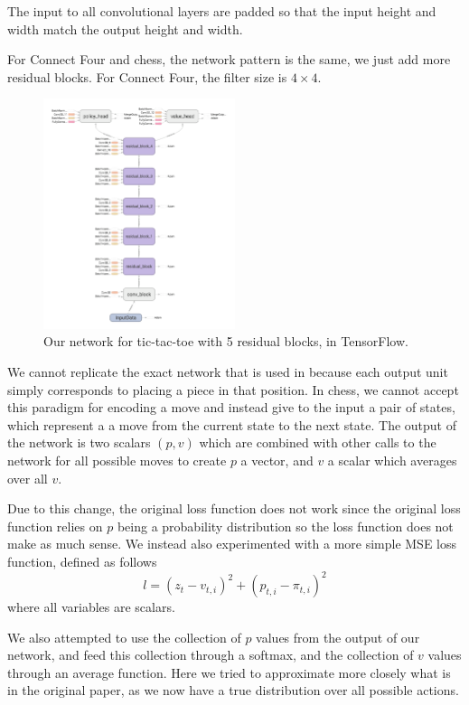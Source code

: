 \documentclass[english]{article}
\begin{document}
The input to all convolutional layers are padded so that the input height and
width match the output height and width.

For Connect Four and chess, the network pattern is the same, we just add more
residual blocks. For Connect Four, the filter size is $4\times 4$.

\begin{figure}
	\centering
    \includegraphics[width=0.5\textwidth]{network}
    \caption{Our network for tic-tac-toe with 5 residual blocks, in TensorFlow.}
\end{figure}

We cannot replicate the exact network that is used in \cite{AlphaGo} because
each output unit simply corresponds to placing a piece in that position. In
chess, we cannot accept this paradigm for encoding a move and instead give to
the input a pair of states, which represent a a move from the current state to
the next state. The output of the network is two scalars $(p, v)$ which are
combined with other calls to the network for all possible moves to create $p$ a
vector, and $v$ a scalar which averages over all $v$.

Due to this change, the original loss function does not work since the original
loss function relies on $p$ being a probability distribution so the loss
function does not make as much sense. We instead also experimented with a more
simple MSE loss function, defined as follows
$$l=(z_{t}-v_{t,i})^2+(p_{t,i}-\pi_{t,i})^2$$
where all variables are scalars.

We also attempted to use the collection of $p$ values from the output of our
network, and feed this collection through a softmax, and the collection of $v$
values through an average function. Here we tried to approximate more closely
what is in the original paper, as we now have a true distribution over all
possible actions.
\end{document}
